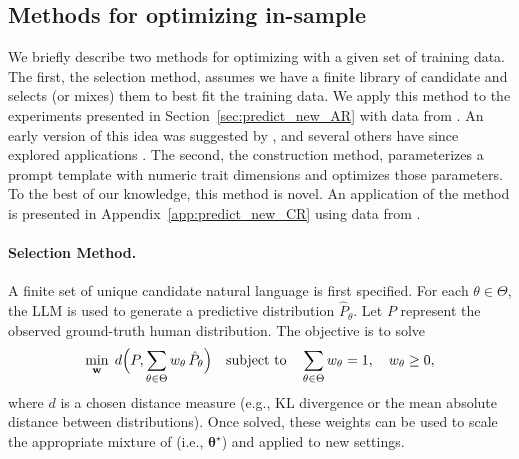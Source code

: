 \subsection{Methods for optimizing  in-sample}

We briefly describe two methods for optimizing  with a given set of training data.
The first, the selection method, assumes we have a finite library of candidate  and selects (or mixes) them to best fit the training data. 
We apply this method to the experiments presented in Section~\ref{sec:predict_new_AR} with data from \cite{1120Arad2012}.
An early version of this idea was suggested by \cite{horton2023large}, and several others have since explored applications \citep{leng2024calibrate,Jackson2025Mixture,bui2025mixture}.
The second, the construction method, parameterizes a prompt template with numeric trait dimensions and optimizes those parameters.
To the best of our knowledge, this method is novel.
An application of the method is presented in Appendix~\ref{app:predict_new_CR} using data from \cite{charness2002understanding}.

\paragraph{Selection Method.}
A finite set of unique candidate natural language  is first specified. 
For each \persona{} $\theta \in \Theta$, the LLM is used to generate a predictive distribution $\hat P_\theta$. 
Let $P$ represent the observed ground-truth human distribution.
The objective is to solve
\[
\min_{\mathbf{w}} \; d \Bigl(P, \sum_{\theta \in \Theta} w_\theta \,\hat P_\theta\Bigr) \quad \text{subject to} \quad \sum_{\theta \in \Theta} w_\theta = 1, \quad w_\theta \ge 0,
\]
where $d$ is a chosen distance measure (e.g., KL divergence or the mean absolute distance between distributions). 
Once solved, these weights can be used to scale the appropriate mixture of  (i.e., $\bm{\theta^{\star}}$) and applied to new settings.

